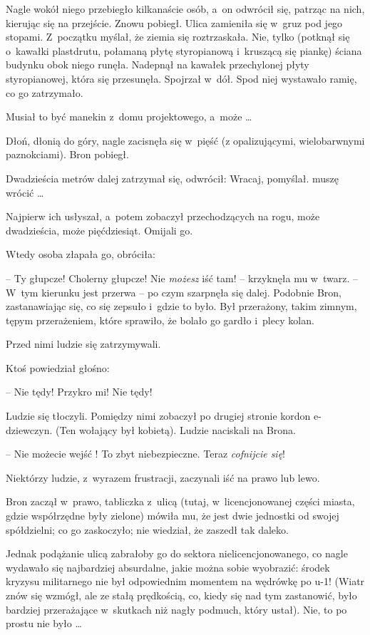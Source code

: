 \documentclass[oneside,polish,11pt,rmheadings]{mwbk}
\begin{document}
Nagle wokół niego przebiegło kilkanaście osób, a~on odwrócił się, patrząc na nich, kierując się na przejście. Znowu pobiegł. Ulica zamieniła się w~gruz pod jego stopami. Z~początku myślał, że ziemia się roztrzaskała. Nie, tylko (potknął się o~kawałki plastdrutu, połamaną płytę styropianową i~kruszącą się piankę) ściana budynku obok niego runęła. Nadepnął na kawałek przechylonej płyty styropianowej, która się przesunęła. Spojrzał w~dół. Spod niej wystawało ramię, co go zatrzymało. 

Musiał to być manekin z~domu projektowego, a~może \ldots  

Dłoń, dłonią do góry, nagle zacisnęła się w~pięść (z opalizującymi, wielobarwnymi paznokciami). Bron pobiegł. 

Dwadzieścia metrów dalej zatrzymał się, odwrócił: Wracaj, pomyślał. muszę wrócić \ldots  

Najpierw ich usłyszał, a~potem zobaczył przechodzących na rogu, może dwadzieścia, może pięćdziesiąt. Omijali go. 

Wtedy osoba złapała go, obróciła: 

-- Ty głupcze! Cholerny głupcze! Nie \textit{możesz }iść tam!  -- krzyknęła mu w~twarz. -- W~tym kierunku jest przerwa -- po czym szarpnęła się dalej. Podobnie Bron, zastanawiając się, co się zepsuło i~gdzie to było. Był przerażony, takim zimnym, tępym przerażeniem, które sprawiło, że bolało go gardło i~plecy kolan. 

Przed nimi ludzie się zatrzymywali. 

Ktoś powiedział głośno:

-- Nie tędy! Przykro mi! Nie tędy! 

Ludzie się tłoczyli. Pomiędzy nimi zobaczył po drugiej stronie kordon e-dziewczyn. (Ten wołający był kobietą). Ludzie naciskali na Brona. 

-- Nie możecie wejść ! To zbyt niebezpieczne. Teraz \textit{cofnijcie się}! 

Niektórzy ludzie, z~wyrazem frustracji, zaczynali iść na prawo lub lewo. 

Bron zaczął w~prawo, tabliczka z~ulicą (tutaj, w~licencjonowanej części miasta, gdzie współrzędne były zielone) mówiła mu, że jest dwie jednostki od swojej spółdzielni; co go zaskoczyło; nie wiedział, że zaszedł tak daleko. 

Jednak podążanie ulicą zabrałoby go do sektora nielicencjonowanego, co nagle wydawało się najbardziej absurdalne, jakie można sobie wyobrazić: środek kryzysu militarnego nie był odpowiednim momentem na wędrówkę po u-1! (Wiatr znów się wzmógł, ale ze stałą prędkością,  co, kiedy się nad tym zastanowić, było bardziej przerażające w~skutkach niż nagły podmuch, który ustał). Nie, to po prostu nie było \ldots  
\end{document}

